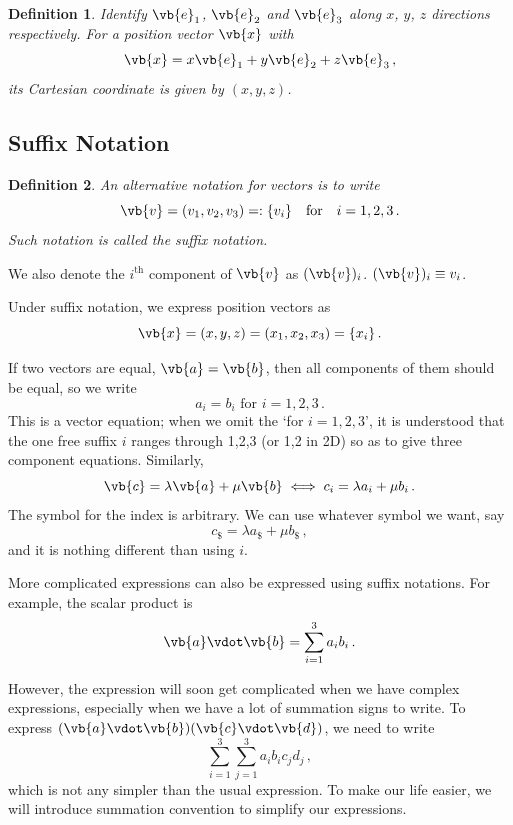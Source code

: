 \documentclass{article}
\theoremstyle{plain}\theoremheaderfont{\normalfont\itshape}\theorembodyfont{\rmfamily}\theoremseparator{.}\newtheorem*{rem}{Remark}\newtheorem*{ex}{Example}\newtheorem*{proof}{Proof}\newtheorem*{altp}{Alternative proof}
\theoremstyle{plain}\theoremheaderfont{\normalfont\bfseries}\theorembodyfont{\rmfamily}\theoremseparator{.}\newtheorem{thm}{Theorem}[section]\newtheorem{lem}[thm]{Lemma}\newtheorem{prop}[thm]{Proposition}\newtheorem*{cor}{Corollary}\newtheorem{defn}[thm]{Definition}\newtheorem{clm}[thm]{Claim}\newtheorem{clminproof}{Claim}
\theoremstyle{break}\theoremheaderfont{\normalfont\itshape}\theorembodyfont{\rmfamily}\theoremseparator{.\medskip}\newtheorem*{proofskip}{Proof}\newtheorem*{exs}{Examples}\newtheorem*{rems}{Remarks}
\theoremstyle{break}\theoremheaderfont{\normalfont\bfseries}\theorembodyfont{\rmfamily}\theoremseparator{.\medskip}\newtheorem{lemskip}[thm]{Lemma}\newtheorem{defnskip}[thm]{Definition}\newtheorem{propskip}[thm]{Proposition}\newtheorem{thmskip}[thm]{Theorem}
\numberwithin{equation}{section}
\begin{document}
	\begin{defn}
		Identify \(\vb{e}_1\), \(\vb{e}_2\) and \(\vb{e}_3\) along \(x\), \(y\), \(z\) directions respectively. For a position vector \(\vb{x}\) with
		\[\vb{x}=x\vb{e}_1+y\vb{e}_2+z\vb{e}_3\,,\]
		its \textit{Cartesian coordinate} is given by \((x,y,z)\).
	\end{defn}
	
	\subsection{Suffix Notation}
	\begin{defn}
		An alternative notation for vectors is to write
		\[\vb{v}=(v_1,v_2,v_3)=:\{ v_i\}\quad\text{for}\quad i=1,2,3\,.\]
		Such notation is called the \textit{suffix notation}.
	\end{defn}
	We also denote the \(i^\text{th}\) component of \(\vb{v}\) as \((\vb{v})_i\). \((\vb{v})_i\equiv v_i\).

	Under suffix notation, we express position vectors as
	\[\vb{x}=(x,y,z)=(x_1,x_2,x_3)=\{x_i\}\,.\]

	If two vectors are equal, \(\vb{a}=\vb{b}\), then all components of them should be equal, so we write
	\[a_i=b_i\text{ for }i=1,2,3\,.\]
	This is a vector equation; when we omit the `for \(i = 1,2,3\)', it is understood that the one free suffix \(i\) ranges through 1,2,3 (or 1,2 in 2D) so as to give three component equations. Similarly,
	\[\vb{c}=\lambda\vb{a}+\mu\vb{b} \iff c_i=\lambda a_i+\mu b_i\,.\]
	The symbol for the index is arbitrary. We can use whatever symbol we want, say
	\[c_{\mathdollar}=\lambda a_{\mathdollar}+\mu b_{\mathdollar}\,,\]
	and it is nothing different than using \(i\).

	More complicated expressions can also be expressed using suffix notations. For example, the scalar product is
	\[\vb{a}\vdot\vb{b}=\sum_{i=1}^{3}a_i b_i\,.\]

	However, the expression will soon get complicated when we have complex expressions, especially when we have a lot of summation signs to write. To express \((\vb{a}\vdot\vb{b})(\vb{c}\vdot\vb{d})\), we need to write
	\[\sum_{i=1}^{3}\sum_{j=1}^{3}a_ib_ic_jd_j\,,\]
	which is not any simpler than the usual expression.	To make our life easier, we will introduce summation convention to simplify our expressions.
	
\end{document}
